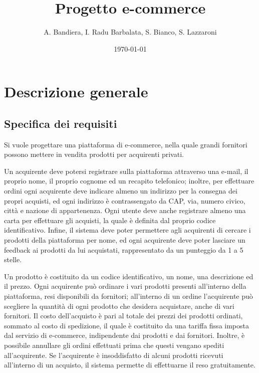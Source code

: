 \documentclass[12pt]{report}
\begin{document}
    \renewcommand{\labelenumii}{\arabic{enumi}.\arabic{enumii}}
    \renewcommand{\labelenumiii}{\arabic{enumi}.\arabic{enumii}.\arabic{enumiii}}
    \renewcommand{\labelenumiv}{\arabic{enumi}.\arabic{enumii}.\arabic{enumiii}.\arabic{enumiv}}

    \title{Progetto e-commerce}
    \author{A. Bandiera, I. Radu Barbalata, S. Bianco, S. Lazzaroni}
    \date{\today}

    \maketitle
    \tableofcontents
    \newpage

    \chapter{Descrizione generale}
    
    \section{Specifica dei requisiti}

    Si vuole progettare una piattaforma di e-commerce, nella quale grandi fornitori possono mettere in vendita prodotti per acquirenti privati.

    Un acquirente deve potersi registrare sulla piattaforma attraverso una e-mail, il proprio nome, il proprio cognome ed un recapito telefonico; inoltre, per effettuare ordini ogni acquirente deve indicare almeno un indirizzo per la consegna dei propri acquisti, ed ogni indirizzo è contrassengato da CAP, via, numero civico, città e nazione di appartenenza. Ogni utente deve anche registrare almeno una carta per effettuare gli acquisti, la quale è definita dal proprio codice identificativo. Infine, il sistema deve poter permettere agli acquirenti di cercare i prodotti della piattaforma per nome, ed ogni acquirente deve poter lasciare un feedback ai prodotti da lui acquistati, rappresentato da un punteggio da 1 a 5 stelle.

    Un prodotto è costituito da un codice identificativo, un nome, una descrizione ed il prezzo. Ogni acquirente può ordinare i vari prodotti presenti all'interno della piattaforma, resi disponibili da fornitori; all'interno di un ordine l'acquirente può scegliere la quantità di ogni prodotto che desidera acquistare, anche di vari fornitori. Il costo dell'acquisto è pari al totale dei prezzi dei prodotti ordinati, sommato al costo di spedizione, il quale è costituito da una tariffa fissa imposta dal servizio di e-commerce, indipendente dai prodotti e dai fornitori. Inoltre, è possibile annullare gli ordini effettuati prima che questi vengano spediti all'acquirente. Se l'acquirente è insoddisfatto di alcuni prodotti ricevuti all'interno di un acquisto, il sistema permette di effettuarne il reso gratuitamente.
\end{document}
